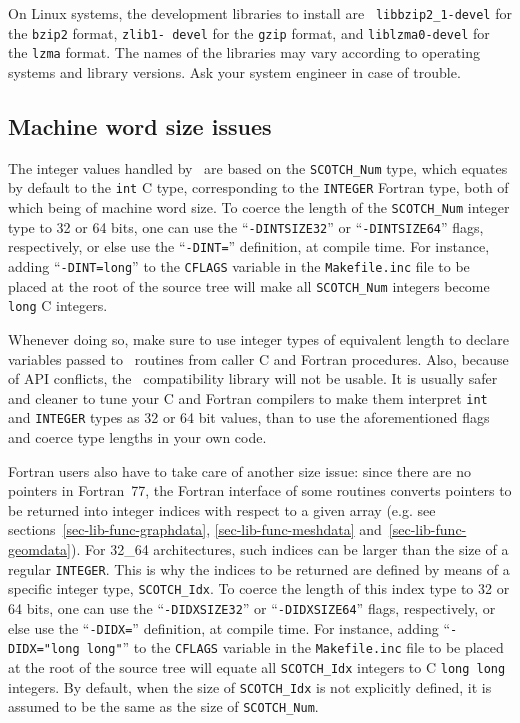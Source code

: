 On Linux systems, the development libraries to install are {\tt
libbzip2\_1-\lbt devel} for the {\tt bzip2} format, {\tt zlib1-\lbt
devel} for the {\tt gzip} format, and {\tt liblzma0-\lbt devel} for
the {\tt lzma} format. The names of the libraries may vary according
to operating systems and library versions. Ask your system engineer in
case of trouble.

\subsection{Machine word size issues}
\label{sec-install-inttypesize}

The integer values handled by \scotch\ are based on the
{\tt SCOTCH\_\lbt Num} type, which equates by default to the {\tt int}
C type, corresponding to the {\tt INTEGER} Fortran type, both of which
being of machine word size. To coerce the length of the
{\tt SCOTCH\_\lbt Num} integer type to 32 or 64 bits, one can use the
``{\tt -DINTSIZE32}'' or ``{\tt -DINTSIZE64}'' flags, respectively, or
else use the ``{\tt -DINT=}'' definition, at compile time. For
instance, adding ``{\tt -DINT=long}'' to the {\tt CFLAGS} variable in
the {\tt Makefile.inc} file to be placed at the root of the source
tree will make all {\tt SCOTCH\_\lbt Num} integers become {\tt long} C
integers.

Whenever doing so, make sure to use integer types of equivalent length
to declare variables passed to \scotch\ routines from caller C and
Fortran procedures. Also, because of API conflicts, the
\metis\ compatibility library will not be usable. It is usually safer
and cleaner to tune your C and Fortran compilers to make them
interpret {\tt int} and {\tt INTEGER} types as 32 or 64 bit values,
than to use the aforementioned flags and coerce type lengths in your
own code.

Fortran users also have to take care of another size issue: since
there are no pointers in Fortran~77, the Fortran interface of some
routines converts pointers to be returned into integer indices with
respect to a given array (e.g. see
sections~\ref{sec-lib-func-graphdata},
\ref{sec-lib-func-meshdata}
and~\ref{sec-lib-func-geomdata}).
For 32\_64 architectures, such indices can be larger than the size of
a regular {\tt INTEGER}. This is why the indices to be returned are
defined by means of a specific integer type, {\tt SCOTCH\_Idx}. To
coerce the length of this index type to 32 or 64 bits, one can use the
``{\tt -DIDXSIZE32}'' or ``{\tt -DIDXSIZE64}'' flags, respectively, or
else use the ``{\tt -DIDX=}'' definition, at compile time. For
instance, adding ``{\tt -DIDX="long~long"}'' to the {\tt CFLAGS}
variable in the {\tt Makefile.inc} file to be placed at the root of
the source tree will equate all {\tt SCOTCH\_\lbt Idx} integers to
C {\tt long long} integers. By default, when the size of
{\tt SCOTCH\_\lbt Idx} is not explicitly defined, it is assumed to be
the same as the size of {\tt SCOTCH\_\lbt Num}.
